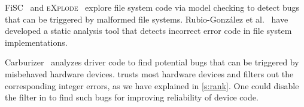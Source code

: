 FiSC~\cite{fisc:yang} and \textsc{eXplode}~\cite{explode:yang}
explore file system code via model checking to detect bugs that can
be triggered by malformed file systems.
%
Rubio-Gonz\'alez et al.~\cite{eio} have developed a static analysis
tool that detects incorrect error code in file system implementations.

Carburizer~\cite{kadav:tolerating} analyzes driver code to find
potential bugs that can be triggered by misbehaved hardware devices.
\sys trusts most hardware devices and filters out the corresponding
integer errors, as we have explained in \autoref{s:rank}.  One could
disable the filter in \sys to find such bugs for improving reliability
of device code.
